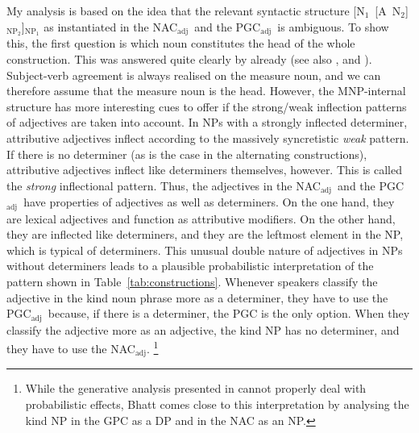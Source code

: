 \documentclass[USenglish]{article}
\newcommand{\Sub}[1]{\ensuremath{\mathrm{_{#1}}}}
\newcommand{\NACa}{NAC\Sub{adj}}
\newcommand{\PGCa}{PGC\Sub{adj}}
\begin{document}
My analysis is based on the idea that the relevant syntactic structure [N\Sub{1}~[A~N\Sub{2}]\Sub{NP\Sub{2}}]\Sub{NP\Sub{1}} as instantiated in the \NACa\ and the \PGCa\ is ambiguous.
To show this, the first question is which noun constitutes the head of the whole construction.
This was answered quite clearly by \cite{Loebel1986} already (see also \citealp[213]{Eschenbach1994}, and \citealp[16]{GallmannLindauer1994}).
Subject-verb agreement is always realised on the measure noun, and we can therefore assume that the measure noun is the head.
However, the MNP-internal structure has more interesting cues to offer if the strong\slash weak inflection patterns of adjectives are taken into account.
In NPs with a strongly inflected determiner, attributive adjectives inflect according to the massively syncretistic \textit{weak} pattern.
If there is no determiner (as is the case in the alternating constructions), attributive adjectives inflect like determiners themselves, however.
This is called the \textit{strong} inflectional pattern.
Thus, the adjectives in the \NACa\ and the \PGCa\ have properties of adjectives as well as determiners.
On the one hand, they are lexical adjectives and function as attributive modifiers.
On the other hand, they are inflected like determiners, and they are the leftmost element in the NP, which is typical of determiners.
This unusual double nature of adjectives in NPs without determiners leads to a plausible probabilistic interpretation of the pattern shown in Table~\ref{tab:constructions}.
Whenever speakers classify the adjective in the kind noun phrase more as a determiner, they have to use the \PGCa\ because, if there is a determiner, the PGC is the only option.
When they classify the adjective more as an adjective, the kind NP has no determiner, and they have to use the \NACa.%
\footnote{While the generative analysis presented in \cite{Bhatt1990} cannot properly deal with probabilistic effects, Bhatt comes close to this interpretation by analysing the kind NP in the GPC as a DP and in the NAC as an NP.}
\end{document}
